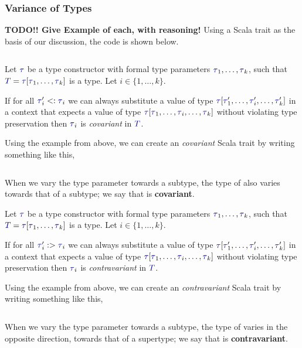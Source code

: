 \subsubsection{Variance of Types}\label{subsubsec:Type_Variance}
\textbf{TODO!! Give Example of each, with reasoning!}
Using a \texttt{} Scala trait as the basis of our discussion, the code is shown below.
\inputminted[frame=lines,linenos]{scala}{./EDAP05-Concepts_Programming_Languages-Sections/Advanced_Data_Types/Code/Box.scala}

\begin{definition}[Covariance]\label{def:Type_Covariance}
  Let $\DataType$ be a type constructor with formal type parameters $\DataType_{1}, \ldots , \DataType_{k}$, such that $\SemanticType{T} = \DataType [\DataType_{1}, \ldots, \DataType_{k}]$ is a type.
  Let $i \in \lbrace 1,\ldots, k \rbrace$.

  If for all $\DataType_{i}' <: \DataType_{i}$ we can always substitute a value of type $\DataType [\DataType_{1}',\ldots, \DataType_{i}', \ldots, \DataType_{k}']$ in a context that expects a value of type $\DataType [\DataType_{1}, \ldots, \DataType_{i}, \ldots, \DataType_{k}]$ without violating type preservation then $\DataType_{i}$ is \emph{covariant} in $\SemanticType{T}$.

  Using the  example from above, we can create an \emph{covariant} Scala trait by writing something like this,
  \inputminted[frame=lines,linenos]{scala}{./EDAP05-Concepts_Programming_Languages-Sections/Advanced_Data_Types/Code/CovariantBox.scala}
  When we vary the type parameter  towards a subtype, the type of  also varies towards that of a subtype; we say that  is \textbf{covariant}.
\end{definition}

\begin{definition}[Contravariance]\label{def:Type_Contravariance}
  Let $\DataType$ be a type constructor with formal type parameters $\DataType_{1}, \ldots , \DataType_{k}$, such that $\SemanticType{T} = \DataType [\DataType_{1}, \ldots, \DataType_{k}]$ is a type.
  Let $i \in \lbrace 1,\ldots, k \rbrace$.

  If for all $\DataType_{i}' :> \DataType_{i}$ we can always substitute a value of type $\DataType [\DataType_{1}',\ldots, \DataType_{i}', \ldots, \DataType_{k}']$ in a context that expects a value of type $\DataType [\DataType_{1}, \ldots, \DataType_{i}, \ldots, \DataType_{k}]$ without violating type preservation then $\DataType_{i}$ is \emph{contravariant} in $\SemanticType{T}$.

  Using the  example from above, we can create an \emph{contravariant} Scala trait by writing something like this,
  \inputminted[frame=lines,linenos]{scala}{./EDAP05-Concepts_Programming_Languages-Sections/Advanced_Data_Types/Code/ContravariantBox.scala}
  When we vary the type parameter  towards a subtype, the type of  varies in the opposite direction, towards that of a supertype; we say that  is \textbf{contravariant}.
\end{definition}

